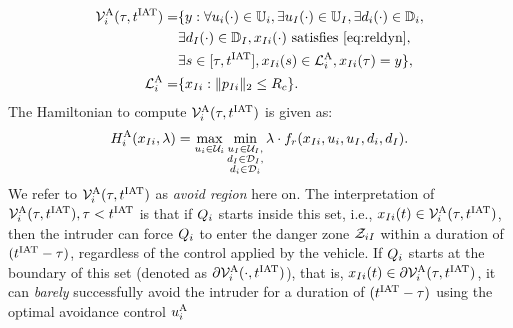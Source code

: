 \begin{equation} \label{eqn:avoidBRS}
\begin{aligned}
\brs^{\text{A}}_{i}(\tau, \iat) = & \{y: \forall \ctrl_i(\cdot) \in \cfset_i, \exists \ctrl_\intr(\cdot) \in \cfset_\intr, \exists \dstb_i(\cdot) \in \dfset_i, \\
& \exists \dstb_\intr(\cdot) \in \dfset_\intr, \state_{\intr i}(\cdot) \text{ satisfies \eqref{eq:reldyn}},\\
& \exists s \in [\tau, \iat], \state_{\intr i}(s) \in \targetset^{\text{A}}_{i}, \state_{\intr i}(\tau) = y\},\\
\targetset^{\text{A}}_{i} = & \{\state_{\intr i}: \|\pos_{\intr i}\|_2 \le \rc\}.
\end{aligned}
\end{equation}
The Hamiltonian to compute $\mathcal{V}^{\text{A}}_{i}(\tau, t^\text{IAT})$ is given as:
\begin{equation}
H^{\text{A}}_{i}(x_{I i}, \lambda) = \max_{u_i \in \mathcal{U}_i} \min_{\substack{u_I \in \mathcal{U}_I, \\ d_I \in \mathcal{D}_I, \\ d_i \in \mathcal{D}_i}} \lambda \cdot f_r(x_{I i}, u_i, u_I, d_i, d_I).
\end{equation}
We refer to $\mathcal{V}^{\text{A}}_i(\tau, t^\text{IAT})$ as \textit{avoid region} here on. The interpretation of $\mathcal{V}^{\text{A}}_{i}(\tau, t^\text{IAT}), \tau < t^\text{IAT}$ is that if $Q_i$ starts inside this set, i.e., $x_{I i}(t) \in  \mathcal{V}^{\text{A}}_{i}(\tau, t^\text{IAT})$, then the intruder can force $Q_i$ to enter the danger zone $\mathcal{Z}_{iI}$ within a duration of $(t^\text{IAT}-\tau)$, regardless of the control applied by the vehicle. If $Q_i$ starts at the boundary of this set (denoted as $\partial \mathcal{V}^{\text{A}}_{i}(\cdot, t^\text{IAT})$), that is, $x_{I i}(t) \in  \partial \mathcal{V}^{\text{A}}_{i}(\tau, t^\text{IAT})$, it can \textit{barely} successfully avoid the intruder for a duration of $(t^\text{IAT}-\tau)$ using the optimal avoidance control ${u^{\text{A}}_{i}}$ 
